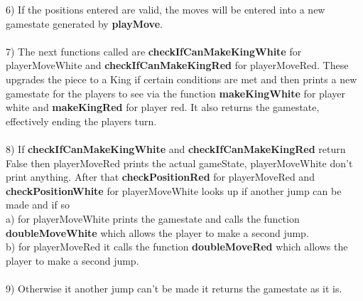 \documentclass[12pt,a4paper]{article}
\begin{document}
6) If the positions entered are valid, the moves will be entered into a new gamestate generated by {\textbf{\small{playMove}}}.\\\\
7) The next functions called are {\textbf{\small{checkIfCanMakeKingWhite}}} for playerMoveWhite and {\textbf{\small{checkIfCanMakeKingRed}}}   for playerMoveRed. These upgrades the piece to a King if certain conditions are met and then prints a new gamestate for the players to see via the function {\textbf{\small{makeKingWhite}}} for player white and {\textbf{\small{makeKingRed}}} for player red. It also returns the gamestate, effectively ending the players turn.\\\\
8) If {\textbf{\small{checkIfCanMakeKingWhite}}} and {\textbf{\small{checkIfCanMakeKingRed}}} return False then 
playerMoveRed prints the actual gameState, playerMoveWhite don't print anything. After that {\textbf{\small{checkPositionRed}}} for playerMoveRed and {\textbf{\small{checkPositionWhite}}} for playerMoveWhite looks up if another jump can be made and if so \\
a) for playerMoveWhite prints the gamestate and 
calls the function {\textbf{\small{doubleMoveWhite}}} which allows the player to make a second jump.\\
b) for playerMoveRed it calls the function 
{\textbf{\small{doubleMoveRed}}} which allows the player to make a second jump.\\\\ 
9) Otherwise it another jump can't be made it returns the gamestate as it is.
\end{document}

